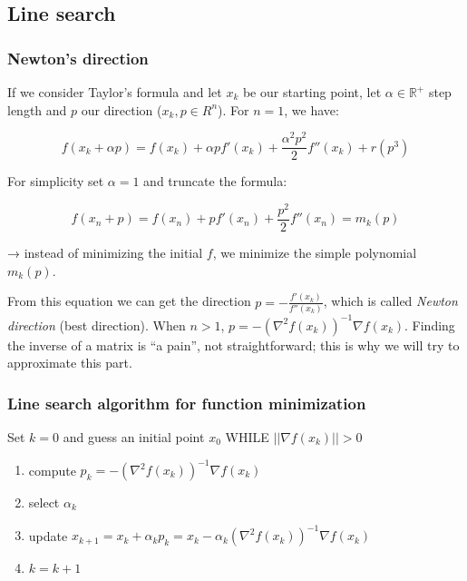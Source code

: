 \hypertarget{line-search}{%
\subsection{Line search}\label{line-search}}

\hypertarget{newtons-direction}{%
\subsubsection{Newton's direction}\label{newtons-direction}}

If we consider Taylor's formula and let $x_k$ be our starting point, let
$\alpha \in \mathbb{R}^+$ step length and $p$ our direction
($x_k, p \in R^n$). For $n=1$, we have:

$$
f(x_k+\alpha p)=f(x_k) + \alpha p f'(x_k) + \frac{\alpha^2p^2}{2} f''(x_k) + r(p^3)
$$

For simplicity set $\alpha=1$ and truncate the formula:

$$
f(x_n+p)=f(x_n) + p f'(x_n) + \frac{p^2}{2} f''(x_n) = m_k(p)
$$

→ instead of minimizing the initial $f$, we minimize the simple
polynomial $m_k(p)$.

From this equation we can get the direction
$p = -\frac{f'(x_k)}{f''(x_k)}$, which is called \emph{Newton direction}
(best direction). When $n>1$,
$p = -(\nabla^2 f(x_k))^{-1}\nabla f(x_k)$. Finding the inverse of a
matrix is ``a pain'', not straightforward; this is why we will try to
approximate this part.

\hypertarget{line-search-algorithm-for-function-minimization}{%
\subsubsection{Line search algorithm for function
minimization}\label{line-search-algorithm-for-function-minimization}}

Set $k=0$ and guess an initial point $x_0$ WHILE $||\nabla f(x_k)||>0$

\begin{enumerate}
\def\labelenumi{\arabic{enumi}.}
\tightlist
\item
  compute $p_k=-(\nabla^2f(x_k))^{-1}\nabla f(x_k)$
\item
  select $\alpha_k$
\item
  update
  $x_{k+1}=x_k+\alpha_kp_k = x_k -\alpha_k(\nabla^2f(x_k))^{-1}\nabla f(x_k)$
\item
  $k=k+1$
\end{enumerate}

